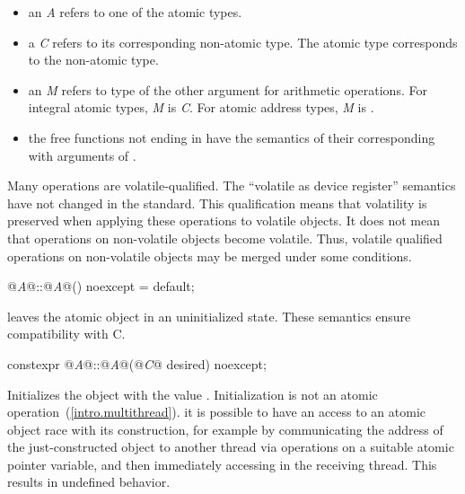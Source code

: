 \begin{itemize}
\item  an \textit{A} refers to one of the atomic types.
\item a \textit{C} refers to its corresponding non-atomic type. The
 atomic type corresponds to the  non-atomic type.
\item an \textit{M} refers to type of the other argument for arithmetic operations. For
integral atomic types, \textit{M} is \textit{C}. For atomic address types, \textit{M} is
.
\item the free functions not ending in  have the semantics of their
corresponding  with  arguments of
.
\end{itemize}

\pnum
\enternote Many operations are volatile-qualified. The ``volatile as device register''
semantics have not changed in the standard. This qualification means that volatility is
preserved when applying these operations to volatile objects. It does not mean that
operations on non-volatile objects become volatile. Thus, volatile qualified operations
on non-volatile objects may be merged under some conditions. \exitnote

%
\begin{itemdecl}
@\textit{A}@::@\textit{A}@() noexcept = default;
\end{itemdecl}

\begin{itemdescr}
\pnum
\effects
leaves the atomic object in an uninitialized state.
\enternote
These semantics ensure compatibility with C.
\exitnote
\end{itemdescr}

%
\begin{itemdecl}
constexpr @\textit{A}@::@\textit{A}@(@\textit{C}@ desired) noexcept;
\end{itemdecl}

\begin{itemdescr}
\pnum
\effects Initializes the object with the value .
Initialization is not an atomic operation~(\ref{intro.multithread}).
\enternote it is possible to have an access to an atomic object 
race with its construction, for example by communicating the address of the
just-constructed object  to another thread via
 operations on a suitable atomic pointer
variable, and then immediately accessing  in the receiving thread.
This results in undefined behavior. \exitnote
\end{itemdescr}

